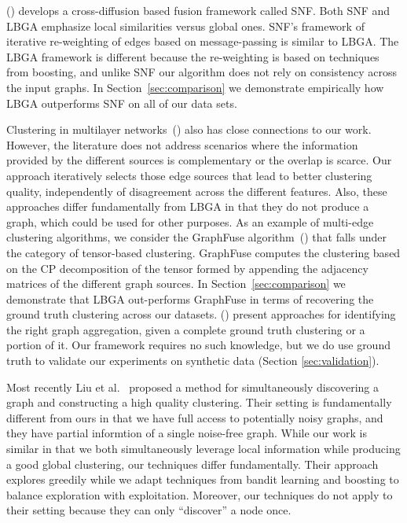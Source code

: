 \documentclass{article}
\begin{document}
(\cite{Wang14}) develops a cross-diffusion based fusion framework called SNF.
Both SNF and LBGA emphasize local similarities versus global ones. SNF's
framework of iterative re-weighting of edges based on message-passing is
similar to LBGA. The LBGA framework is different because the re-weighting is
based on techniques from boosting, and unlike SNF our algorithm does not rely
on consistency across the input graphs. In Section~\ref{sec:comparison} we
demonstrate empirically how LBGA outperforms SNF on all of our data sets.
 
Clustering in multilayer
networks~(\cite{Papalexakis2013,Tang2009,Tang2012,Mucha2010,Berlingerio2011,kolda2009,Shiga12})
also has close connections to our work. However, the literature does not
address scenarios where the information provided by the different sources is
complementary or the overlap is scarce. Our approach iteratively selects those
edge sources that lead to better clustering quality, independently of
disagreement across the different features. Also, these approaches differ
fundamentally from LBGA in that they do not produce a graph, which could be
used for other purposes. As an example of multi-edge clustering algorithms, we
consider the GraphFuse algorithm~(\cite{Papalexakis2013}) that falls under the
category of tensor-based clustering. GraphFuse computes the clustering based on
the CP decomposition of the tensor formed by appending the adjacency matrices
of the different graph sources. In Section~\ref{sec:comparison} we demonstrate
that LBGA out-performs GraphFuse in terms of recovering the ground truth
clustering across our datasets. (\cite{Rocklin2013,Cai2005}) present approaches
for identifying the right graph aggregation, given a complete ground truth
clustering or a portion of it. Our framework requires no such knowledge, but we
do use ground truth to validate our experiments on synthetic data (Section
\ref{sec:validation}).

Most recently Liu et al.~\cite{LiuAH15} proposed a method for simultaneously
discovering a graph and constructing a high quality clustering. Their setting
is fundamentally different from ours in that we have full access to potentially
noisy graphs, and they have partial informtion of a single noise-free graph.
While our work is similar in that we both simultaneously leverage local
information while producing a good global clustering, our techniques differ
fundamentally. Their approach explores greedily while we adapt techniques from
bandit learning and boosting to balance exploration with exploitation.
Moreover, our techniques do not apply to their setting because they can only
``discover'' a node once.  
\end{document}
